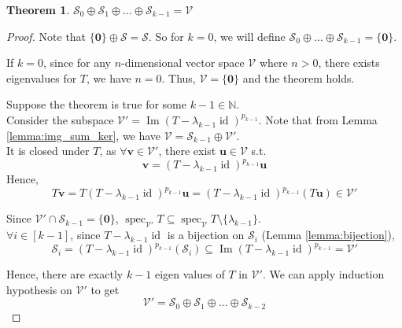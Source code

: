 \documentclass{article}
\theoremstyle{plain}
\newtheorem{theorem}{Theorem}[section]
\theoremstyle{definition}
\newcommand{\0}{\mathbf{0}}
\renewcommand{\vec}{\mathbf}
\newcommand{\N}{\mathbb{N}}
\newcommand{\vecspace}[1]{\mathcal{#1}}
\DeclareMathOperator{\id}{id}
\DeclareMathOperator{\img}{Im}
\DeclareMathOperator{\spec}{spec}
\begin{document}
\begin{theorem}
    $\vecspace{S}_0\oplus\vecspace{S}_1\oplus\dots\oplus\vecspace{S}_{k-1}=\vecspace{V}$
\end{theorem}
\begin{proof}
    Note that $\{\0\}\oplus\vecspace{S}=\vecspace{S}$. So for $k=0$, we will define $\vecspace{S}_0\oplus\dots\oplus\vecspace{S}_{k-1}=\{\0\}$.

    If $k=0$, since for any $n$-dimensional vector space $\vecspace{V}$ where $n > 0$, there exists eigenvalues for $T$, we have $n=0$.
    Thus, $\vecspace{V}=\{\0\}$ and the theorem holds.

    Suppose the theorem is true for some $k-1\in\N$. \\
    Consider the subspace $\vecspace{V}'=\img(T-\lambda_{k-1}\id)^{p_{k-1}}$.
    Note that from Lemma \ref{lemma:img_sum_ker}, we have $\vecspace{V} = \vecspace{S}_{k-1} \oplus \vecspace{V}'$.\\
    It is closed under $T$, as $\forall\vec{v}\in\vecspace{V}'$, there exist $\vec{u}\in\vecspace{V}$ s.t.
    \begin{equation*}
        \vec{v}=(T-\lambda_{k-1}\id)^{p_{k-1}}\vec{u}
    \end{equation*}
    Hence,
    \begin{equation*}
        T\vec{v} = T(T-\lambda_{k-1}\id)^{p_{k-1}}\vec{u} = (T-\lambda_{k-1}\id)^{p_{k-1}}(T\vec{u})\in\vecspace{V}'
    \end{equation*}

    Since $\vecspace{V}'\cap\vecspace{S}_{k-1}=\{\0\}$, $\spec_{\vecspace{V}'}T \subseteq \spec_{\vecspace{V}}T\setminus\{\lambda_{k-1}\}$.\\
    $\forall i\in[k-1]$, since $T-\lambda_{k-1}\id$ is a bijection on $\vecspace{S}_i$ (Lemma \ref{lemma:bijection}),
    \begin{equation*}
        \vecspace{S}_i=(T-\lambda_{k-1}\id)^{p_{k-1}}(\vecspace{S}_i)\subseteq\img(T-\lambda_{k-1}\id)^{p_{k-1}}=\vecspace{V}'
    \end{equation*}

    Hence, there are exactly $k-1$ eigen values of $T$ in $\vecspace{V}'$.
    We can apply induction hypothesis on $\vecspace{V}'$ to get
    \begin{equation*}
        \vecspace{V}' = \vecspace{S}_0\oplus\vecspace{S}_1\oplus\dots\oplus\vecspace{S}_{k-2}
    \end{equation*}


\end{proof}
\end{document}
